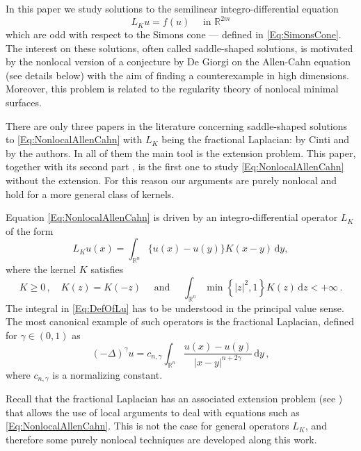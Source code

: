 \documentclass[12pt,reqno]{amsart}
\theoremstyle{definition}
\theoremstyle{remark}
\newcommand{\con}[1]{\mathbb{#1}}
\newcommand{\R}{\con{R}} %
\newcommand{\s}{\gamma}
\newcommand{\fraclaplacian}{(-\Delta)^\s}
\renewcommand{\d}{\,\mathrm{d}} %
\numberwithin{equation}{section}
\begin{document}
In this paper we study solutions to the semilinear integro-differential equation
\begin{equation}
\label{Eq:NonlocalAllenCahn}
L_K u = f(u) \quad \textrm{ in } \R^{2m}
\end{equation}
which are odd with respect to the Simons cone --- defined in \eqref{Eq:SimonsCone}. The interest on these solutions, often called saddle-shaped solutions, is motivated by the nonlocal version of a conjecture by De Giorgi on the Allen-Cahn equation (see details below) with the aim of finding a counterexample in high dimensions. Moreover, this problem is related to the regularity theory of nonlocal minimal surfaces.

There are only three papers in the literature concerning saddle-shaped solutions to \eqref{Eq:NonlocalAllenCahn} with $L_K$ being the fractional Laplacian: \cite{Cinti-Saddle, Cinti-Saddle2} by Cinti and \cite{Felipe-Sanz-Perela:SaddleFractional} by the authors. In all of them the main tool is the extension problem. This paper, together with its second part  \cite{FelipeSanz-Perela:IntegroDifferentialII}, is the first one to study \eqref{Eq:NonlocalAllenCahn} without the extension. For this reason our arguments are purely nonlocal and hold for a more general class of kernels.



Equation \eqref{Eq:NonlocalAllenCahn} is driven by an integro-differential operator $L_K$ of the form
\begin{equation}
\label{Eq:DefOfLu}
L_Ku(x) = \int_{\R^n} \{u(x) - u(y)\} K(x-y)\d y,
\end{equation}
where the kernel $K$ satisfies
\begin{equation}
\label{Eq:Symmetry&IntegrabilityOfK}
K\geq 0\,, \quad K(z) = K(-z) \quad \textrm{ and } \quad \int_{\R^n} \min \left\{ |z|^2, 1 \right\} K(z) \d z < + \infty\,.
\end{equation}
The integral in \eqref{Eq:DefOfLu} has to be understood in the principal value sense. The most canonical example of such operators is the fractional Laplacian, defined for $\s\in(0,1)$ as
$$
\fraclaplacian u = c_{n, \s} \int_{\R^n} \dfrac{u(x) - u(y)}{|x-y|^{n + 2\s}}\d y\,,
$$
where $c_{n, \s}$ is a normalizing constant.

Recall that the fractional Laplacian has an associated extension problem (see \cite{CaffarelliSilvestre}) that allows the use of local arguments to deal with equations such as \eqref{Eq:NonlocalAllenCahn}. This is not the case for general operators $L_K$, and therefore some purely nonlocal techniques are developed along this work. 
\end{document}
